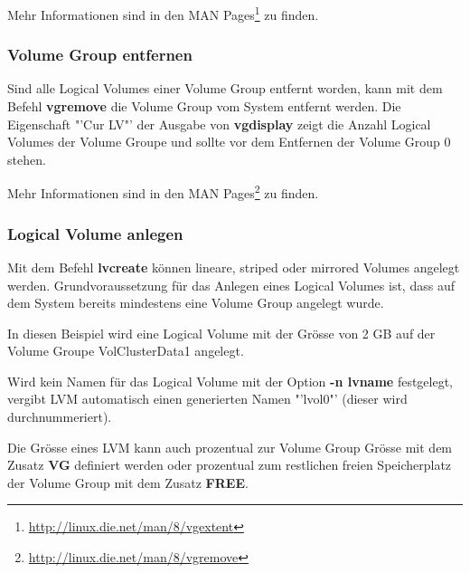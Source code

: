 

Mehr Informationen sind in den MAN Pages\footnote{\href{http://linux.die.net/man/8/vgextent}{http://linux.die.net/man/8/vgextent}} zu finden.

\subsubsection{Volume Group entfernen}

Sind alle Logical Volumes einer Volume Group entfernt worden, kann mit dem Befehl \textbf{vgremove} die Volume Group vom System entfernt werden. Die Eigenschaft "'Cur LV"' der Ausgabe von \textbf{vgdisplay} zeigt die Anzahl Logical Volumes der Volume Groupe und sollte vor dem Entfernen der Volume Group 0 stehen.


Mehr Informationen sind in den MAN Pages\footnote{\href{http://linux.die.net/man/8/vgremove}{http://linux.die.net/man/8/vgremove}} zu finden.

\subsubsection{Logical Volume anlegen}

Mit dem Befehl \textbf{lvcreate}  können lineare, striped oder mirrored Volumes angelegt werden.
Grundvoraussetzung für das Anlegen eines Logical Volumes ist, dass auf dem System bereits mindestens eine Volume Group angelegt wurde.

In diesen Beispiel wird eine Logical Volume mit der Grösse von 2 GB auf der Volume Groupe VolClusterData1 angelegt. 


Wird kein Namen für das Logical Volume mit der Option \textbf{-n lvname} festgelegt, vergibt LVM automatisch einen generierten Namen "'lvol0"' (dieser wird durchnummeriert).


Die Grösse eines LVM kann auch prozentual zur Volume Group Grösse mit dem Zusatz \textbf{VG} definiert werden oder prozentual zum restlichen freien Speicherplatz der Volume Group mit dem Zusatz \textbf{FREE}.



